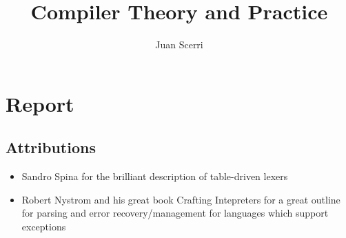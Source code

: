 \documentclass[article]{uom-coursework}
\title{Compiler Theory and Practice}
\author{Juan Scerri}
\begin{document}

\pagestyle{umpage}

\frontmatter

\maketitle %

\tableofcontents %

\clearpage

\lstlistoflistings

\clearpage

\mainmatter

\chapter*{Report}
\label{chap:report}






\section{Attributions}

\begin{itemize}
    \item Sandro Spina for the brilliant description of table-driven lexers
    \item Robert Nystrom and his great book Crafting Intepreters for a great
        outline for parsing and error recovery/management for languages
        which support exceptions
\end{itemize}
\end{document}

